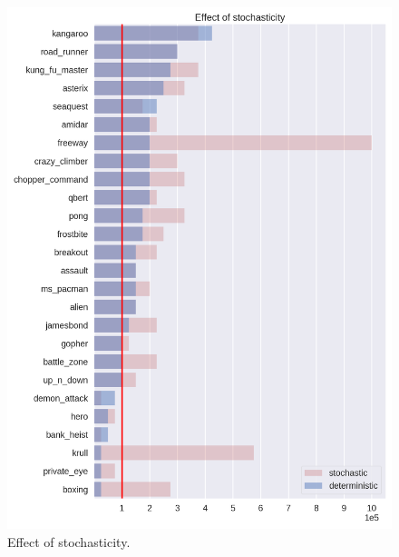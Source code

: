 \begin{figure}
\centering
\includegraphics[width=0.9\columnwidth]{figures/eval_long.png}
\caption{Effect of stochasticity.} 
\label{fig:effects_stocha}
\end{figure}

